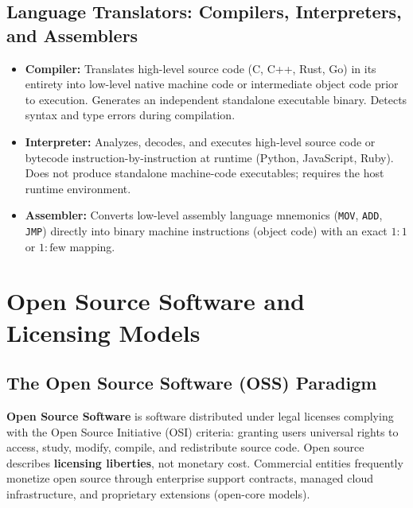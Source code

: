 \subsection{Language Translators: Compilers, Interpreters, and Assemblers}
\begin{itemize}
    \item \textbf{Compiler:} Translates high-level source code (C, C++, Rust, Go) in its entirety into low-level native machine code or intermediate object code prior to execution. Generates an independent standalone executable binary. Detects syntax and type errors during compilation.
    \item \textbf{Interpreter:} Analyzes, decodes, and executes high-level source code or bytecode instruction-by-instruction at runtime (Python, JavaScript, Ruby). Does not produce standalone machine-code executables; requires the host runtime environment.
    \item \textbf{Assembler:} Converts low-level assembly language mnemonics (\texttt{MOV}, \texttt{ADD}, \texttt{JMP}) directly into binary machine instructions (object code) with an exact $1:1$ or $1:\text{few}$ mapping.
\end{itemize}

\section{Open Source Software and Licensing Models}
\label{sec:open_source_software}

\subsection{The Open Source Software (OSS) Paradigm}
\textbf{Open Source Software} is software distributed under legal licenses complying with the Open Source Initiative (OSI) criteria: granting users universal rights to access, study, modify, compile, and redistribute source code. Open source describes \textbf{licensing liberties}, not monetary cost. Commercial entities frequently monetize open source through enterprise support contracts, managed cloud infrastructure, and proprietary extensions (open-core models).

